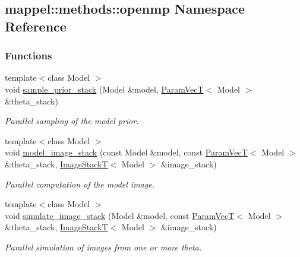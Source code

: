 \hypertarget{namespacemappel_1_1methods_1_1openmp}{}\subsection{mappel\+:\+:methods\+:\+:openmp Namespace Reference}
\label{namespacemappel_1_1methods_1_1openmp}
\subsubsection*{Functions}
\begin{DoxyCompactItemize}
\item 
{\footnotesize template$<$class Model $>$ }\\void \hyperlink{namespacemappel_1_1methods_1_1openmp_a30d60c212568479d6f2b80f12c171d9e}{sample\+\_\+prior\+\_\+stack} (Model \&model, \hyperlink{namespacemappel_a0f86d3153e4e27b095012f140eea58de}{Param\+VecT}$<$ Model $>$ \&theta\+\_\+stack)
\begin{DoxyCompactList}\small\item\em Parallel sampling of the model prior. \end{DoxyCompactList}\item 
{\footnotesize template$<$class Model $>$ }\\void \hyperlink{namespacemappel_1_1methods_1_1openmp_a618f312f9e8b3a5d9972be5d755a7edb}{model\+\_\+image\+\_\+stack} (const Model \&model, const \hyperlink{namespacemappel_a0f86d3153e4e27b095012f140eea58de}{Param\+VecT}$<$ Model $>$ \&theta\+\_\+stack, \hyperlink{namespacemappel_a636dbe5b195c267a5f6a65cd48ff94a6}{Image\+StackT}$<$ Model $>$ \&image\+\_\+stack)
\begin{DoxyCompactList}\small\item\em Parallel computation of the model image. \end{DoxyCompactList}\item 
{\footnotesize template$<$class Model $>$ }\\void \hyperlink{namespacemappel_1_1methods_1_1openmp_a49b53ce5958e1a69e5b4cf8d4b0b1420}{simulate\+\_\+image\+\_\+stack} (Model \&model, const \hyperlink{namespacemappel_a0f86d3153e4e27b095012f140eea58de}{Param\+VecT}$<$ Model $>$ \&theta\+\_\+stack, \hyperlink{namespacemappel_a636dbe5b195c267a5f6a65cd48ff94a6}{Image\+StackT}$<$ Model $>$ \&image\+\_\+stack)
\begin{DoxyCompactList}\small\item\em Parallel simulation of images from one or more theta. \end{DoxyCompactList}\item 

\end{DoxyCompactItemize}
